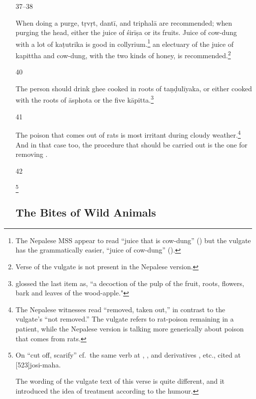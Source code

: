 \begin{translation}
\begin{itemize}
\item[37--38]

When doing a purge, \gls{tṛvṛt}, \gls{dantī}, and \gls{triphalā} are
recommended;  when purging the head, either the juice of \gls{śirīṣa}
or its fruits. Juice of cow-dung with a lot of \gls{kaṭutrika} is
good in collyrium.\footnote{The Nepalese MSS appear to read “juice
    that is cow-dung” () but the vulgate has the
    grammatically easier, “juice of cow-dung” ().} an
    electuary of the juice of \gls{kapittha} and cow-dung, with the two
    kinds of honey, is recommended.\footnote{Verse  of
        the vulgate is not present in the Nepalese version.}

\item[40]

The person should drink ghee cooked in roots of \gls{taṇḍulīyaka}, or
either cooked with the roots of \gls{āsphota} or the five
\gls{kāpitta}.\footnote{ glossed the last item
    as, “a decoction of the pulp of the fruit, roots, flowers, bark and leaves
    of the wood-apple."}

\item[41]

The poison that comes out of rats is most irritant during cloudy
weather.\footnote{The Nepalese witnesses read 
    “removed, taken out,” in contrast to the vulgate's 
    “not removed.”  The vulgate refers to rat-poison remaining in a
    patient, while the Nepalese version is talking more generically about
    poison that comes from rats.} And in that case too, the procedure
    that should be carried out is the one for removing
    .
    
\item[42]

\footnote{On  “cut off, scarify” cf.\ the same
    verb at , , and derivatives
    , etc., cited at
    [523]{josi-maha}.

The wording of the vulgate text of this verse is quite different, and it
introduced the idea of treatment according to the humour.}

\subsection{The Bites of Wild Animals}
\label{rabies}


\end{itemize}
\end{translation}

